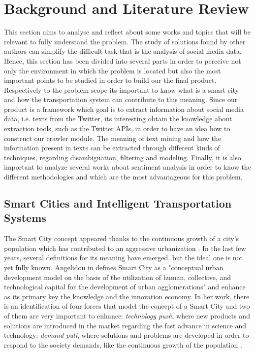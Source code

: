 

\chapter{Background and Literature Review} \label{chap:sota}

This section aims to analyse and reflect about some works and topics that will be relevant to fully understand the problem. The study of solutions found by other authors can simplify the difficult task that is the analysis of social media data.
Hence, this section has been divided into several parts in order to perceive not only the environment in which the problem is located but also the most important points to be studied in order to build our the final product. Respectively to the problem scope its important to know what is a smart city and how the transportation system can contribute to this meaning. Since our product is a framework which goal is to extract information about social media data, i.e. texts from the Twitter, its interesting obtain the knowledge about extraction tools, such as the Twitter APIs, in order to have an idea how to construct our crawler module. The meaning of text mining and how the information present in texts can be extracted through different kinds of techniques, regarding disambiguation, filtering and modeling. Finally, it is also important to analyze several works about sentiment analysis in order to know the different methodologies and which are the most advantageous for this problem.

\section{Smart Cities and Intelligent Transportation Systems}\label{sec:smartcities}

The Smart City concept appeared thanks to the continuous growth of a city's population which has contributed to an aggressive urbanization \cite{kn:Cecilia2016}. In the last few years, several definitions for its meaning have emerged, but the ideal one is not yet fully known. Angelidou in \cite{kn:Angelidou2015} defines Smart City as a "conceptual urban development model on the basis of the utilization of human, collective, and technological capital for the development of urban agglomerations" and enhance as its primary key the knowledge and the innovation economy. In her work, there is an identification of four forces that model the concept of a Smart City and two of them are very important to enhance: \textit{technology push}, where new products and solutions are introduced in the market regarding the fast advance in science and technology; \textit{demand pull}, where solutions and problems are developed in order to respond to the society demands, like the continuous growth of the population \cite{kn:Angelidou2015}.


